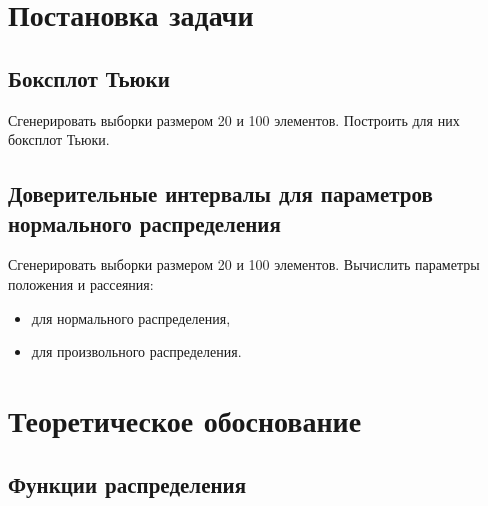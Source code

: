 \documentclass[12pt,a4paper]{article}
\begin{document}
	\section{Постановка задачи}

	\subsection{Боксплот Тьюки}

	Сгенерировать выборки размером 20 и 100 элементов. Построить для них боксплот Тьюки.

	\subsection{Доверительные интервалы для параметров нормального распределения}

	Сгенерировать выборки размером 20 и 100 элементов. Вычислить параметры положения и рассеяния:

	\begin{itemize}
		\item для нормального распределения,
		\item для произвольного распределения.
	\end{itemize}

	\section{Теоретическое обоснование}

	\subsection{Функции распределения}
\end{document}
